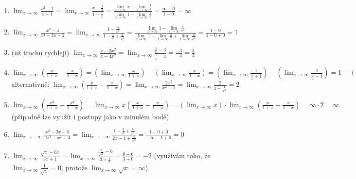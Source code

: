 \documentclass[10pt,a4paper]{article}
\begin{document}
\begin{enumerate}
	\everymath{\displaystyle}
	\parskip\bigskipamount
	\lineskip\medskipamount
	\item $\lim_{x\to\infty} \frac{x^2-1}{x-1} = \lim_{x\to\infty} \frac{x - \frac1x}{1-\frac1x} = \frac{\lim\limits_{x\to\infty} x - \lim\limits_{x\to\infty} \frac1x}{\lim\limits_{x\to\infty}1 - \lim\limits_{x\to\infty}\frac1x} = \frac{\infty - 0}{1 - 0} = \infty$
	\item $\lim_{x\to\infty} \frac{x^2-4}{x^2 - 3x + 2} = \lim_{x\to\infty} \frac{1 - \frac{4}{x^2}}{1 - \frac3x + \frac2{x^2}} = \frac{\lim\limits_{x\to\infty}1 - \lim\limits_{x\to\infty}\frac{4}{x^2}}{\lim\limits_{x\to\infty}1 - \lim\limits_{x\to\infty}\frac3x + \lim\limits_{x\to\infty}\frac2{x^2}} = \frac{1 - 0}{1 - 0 + 0} = 1$
	\item (už trochu rychleji) $\lim_{x\to\infty} \frac{x - 3x^2}{x - 4x^2} = \lim_{x\to\infty} \frac{\frac1x - 3}{\frac1x - 4} = \frac{-3}{-4} = \frac34$
	\item $\lim_{x\to\infty} \left( \frac{x}{1+x} - \frac{x}{1-x} \right) = \left(\lim_{x\to\infty} \frac{x}{1+x}\right) - \left(\lim_{x\to\infty}\frac{x}{1-x}\right) = \left(\lim_{x\to\infty} \frac{1}{\frac1x+1}\right) - \left(\lim_{x\to\infty}\frac{1}{\frac1x-1}\right) = 1 - (-1) = 2$\\
	alternativně: $\lim_{x\to\infty} \left( \frac{x}{1+x} - \frac{x}{1-x} \right) = \lim_{x\to\infty} \frac{2x^2}{x^2 - 1} = \lim_{x\to\infty} \frac{2}{1 - \frac1{x^2}} = 2$
	\item $\lim_{x\to\infty} \left( \frac{x^2}{1+x} - \frac{x^2}{1-x} \right) = \lim_{x\to\infty} x\left( \frac{x}{1+x} - \frac{x}{1-x} \right) = \left(\lim_{x\to\infty} x\right) \cdot  \lim_{x\to\infty} \left( \frac{x}{1+x} - \frac{x}{1-x} \right) = \infty \cdot 2 = \infty$\\
	(případně lze využít i postupy jako v minulém bodě)
	\item $\lim_{x \to -\infty} \frac{x^2 - 2x + 5}{2x^3 - x^2 + 4} = \lim_{x \to -\infty} \frac{1 - \frac2x + \frac5{x^2}}{2x - 1 + \frac4{x^2}} = \frac{1 - 0 + 0}{-\infty -1 + 0} = 0$
	\item $\lim_{x \to \infty} \frac{\sqrt x - 6x}{3x+1} = \lim_{x \to \infty}\frac{\frac{1}{\sqrt x} - 6}{3 + \frac1x} = \frac{0 - 6}{3 + 0} = -2$ (využívám toho, že $\lim_{x \to \infty}\tfrac{1}{\sqrt x} = 0$, protože $\lim_{x \to \infty}\sqrt x = \infty$)
	
	
\end{enumerate}
\end{document}
